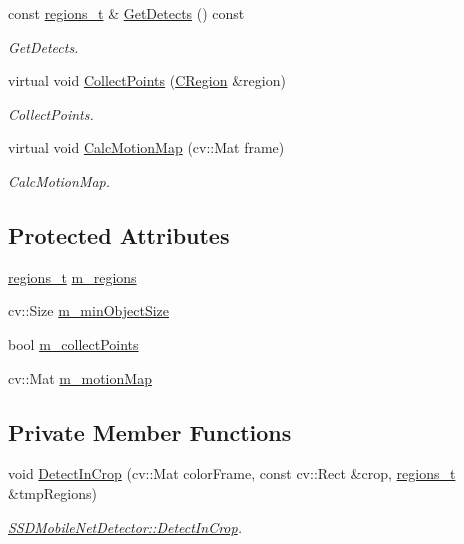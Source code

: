 \begin{DoxyCompactItemize}
const \mbox{\hyperlink{defines_8h_a01db0de56a20f4342820a093c5154536}{regions\+\_\+t}} \& \mbox{\hyperlink{class_base_detector_a52ac4b2feed15a47de84a69eb45c233f}{Get\+Detects}} () const
\begin{DoxyCompactList}\small\item\em Get\+Detects. \end{DoxyCompactList}\item 
virtual void \mbox{\hyperlink{class_base_detector_a20380b0980c6f262b0829f37fb89d2a7}{Collect\+Points}} (\mbox{\hyperlink{class_c_region}{C\+Region}} \&region)
\begin{DoxyCompactList}\small\item\em Collect\+Points. \end{DoxyCompactList}\item 
virtual void \mbox{\hyperlink{class_base_detector_a73c66f0d4dad263fcf65c09a6f6feda2}{Calc\+Motion\+Map}} (cv\+::\+Mat frame)
\begin{DoxyCompactList}\small\item\em Calc\+Motion\+Map. \end{DoxyCompactList}\end{DoxyCompactItemize}
\subsection*{Protected Attributes}
\begin{DoxyCompactItemize}
\item 
\mbox{\hyperlink{defines_8h_a01db0de56a20f4342820a093c5154536}{regions\+\_\+t}} \mbox{\hyperlink{class_base_detector_a409c20093acba261db8354ca72058fce}{m\+\_\+regions}}
\item 
cv\+::\+Size \mbox{\hyperlink{class_base_detector_a651b938c89c94daac4763728637d90c9}{m\+\_\+min\+Object\+Size}}
\item 
bool \mbox{\hyperlink{class_base_detector_a403cbf784fcb960bdb7d080c86c4a2ea}{m\+\_\+collect\+Points}}
\item 
cv\+::\+Mat \mbox{\hyperlink{class_base_detector_a45a2d54a0b69e271aa5c44ee301682b7}{m\+\_\+motion\+Map}}
\end{DoxyCompactItemize}
\subsection*{Private Member Functions}
\begin{DoxyCompactItemize}
\item 
void \mbox{\hyperlink{class_s_s_d_mobile_net_detector_a9c0fe7a122d0b229d84965f472cc6c38}{Detect\+In\+Crop}} (cv\+::\+Mat color\+Frame, const cv\+::\+Rect \&crop, \mbox{\hyperlink{defines_8h_a01db0de56a20f4342820a093c5154536}{regions\+\_\+t}} \&tmp\+Regions)
\begin{DoxyCompactList}\small\item\em \mbox{\hyperlink{class_s_s_d_mobile_net_detector_a9c0fe7a122d0b229d84965f472cc6c38}{S\+S\+D\+Mobile\+Net\+Detector\+::\+Detect\+In\+Crop}}. \end{DoxyCompactList}\end{DoxyCompactItemize}
